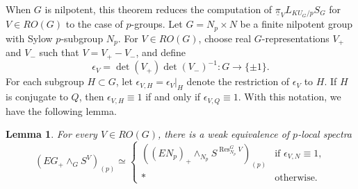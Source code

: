 \documentclass{amsart}
\theoremstyle{plain}
\newtheorem{lemma}[theorem]{Lemma}
\theoremstyle{definition}
\theoremstyle{remark}
\begin{document}
When $G$ is nilpotent, this theorem reduces the computation of $\underline{\pi}_V L_{KU_G/p}S_G$ for $V\in RO(G)$ to the case of $p$-groups. Let $G=N_p\times N$ be a finite nilpotent group with Sylow $p$-subgroup $N_p$. For $V\in RO(G)$, choose real $G$-representations $V_+$ and $V_-$ such that $V=V_+-V_-$, and define 
\[
\epsilon_V=\det(V_+)\det(V_-)^{-1} \colon G\to \{\pm 1\}.
\]
For each subgroup $H\subset G$, let $\epsilon_{V,H}=\epsilon_V|_H$ denote the restriction of $\epsilon_V$ to $H$. If $H$ is conjugate to $Q$, then $\epsilon_{V,H}\equiv 1$ if and only if $\epsilon_{V,Q}\equiv 1$. With this notation, we have the following lemma.

\begin{lemma}\label{lem: stable splitting of Thom speces}
For every $V\in RO(G)$, there is a weak equivalence of $p$-local spectra
\[
    (EG_+\wedge_G S^V)_{(p)} \simeq \begin{cases}
        ((EN_p)_+\wedge_{N_p} S^{\operatorname{Res}_{N_p}^G V})_{(p)} & \text{if } \epsilon_{V,N}\equiv 1,\\
        \ast & \text{otherwise.} 
    \end{cases}
\]
\end{lemma}
\end{document}
